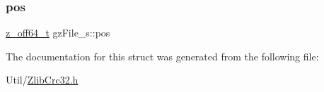 \subsubsection{\texorpdfstring{pos}{pos}}
{\footnotesize\ttfamily \mbox{\hyperlink{ZlibCrc32_8h_ab9923767082c7a76924b31493e60d42c}{z\+\_\+off64\+\_\+t}} gz\+File\+\_\+s\+::pos}



The documentation for this struct was generated from the following file\+:\begin{DoxyCompactItemize}
\item 
Util/\mbox{\hyperlink{ZlibCrc32_8h}{Zlib\+Crc32.\+h}}\end{DoxyCompactItemize}
